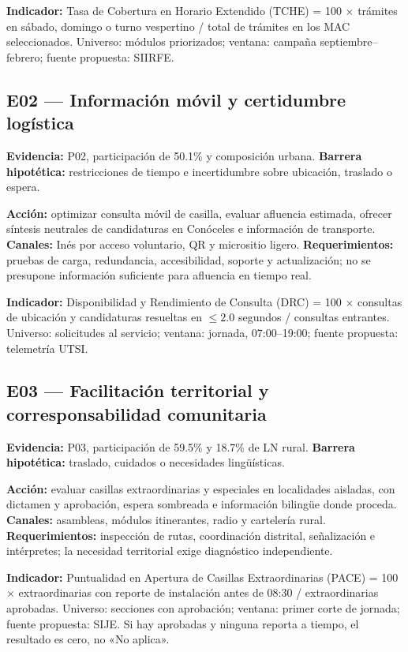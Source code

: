 \documentclass[11pt]{article}
\begin{document}
\textbf{Indicador:} Tasa de Cobertura en Horario Extendido (TCHE) = 100 $\times$ trámites en sábado, domingo o turno vespertino / total de trámites en los MAC seleccionados. Universo: módulos priorizados; ventana: campaña septiembre--febrero; fuente propuesta: SIIRFE.

\subsection{E02 --- Información móvil y certidumbre logística}
\textbf{Evidencia:} P02, participación de 50.1\% y composición urbana.
\textbf{Barrera hipotética:} restricciones de tiempo e incertidumbre sobre ubicación, traslado o espera.

\textbf{Acción:} optimizar consulta móvil de casilla, evaluar afluencia estimada, ofrecer síntesis neutrales de candidaturas en Conóceles e información de transporte.
\textbf{Canales:} Inés por acceso voluntario, QR y micrositio ligero.
\textbf{Requerimientos:} pruebas de carga, redundancia, accesibilidad, soporte y actualización; no se presupone información suficiente para afluencia en tiempo real.

\textbf{Indicador:} Disponibilidad y Rendimiento de Consulta (DRC) = 100 $\times$ consultas de ubicación y candidaturas resueltas en $\leq2.0$ segundos / consultas entrantes. Universo: solicitudes al servicio; ventana: jornada, 07:00--19:00; fuente propuesta: telemetría UTSI.

\subsection{E03 --- Facilitación territorial y corresponsabilidad comunitaria}
\textbf{Evidencia:} P03, participación de 59.5\% y 18.7\% de LN rural.
\textbf{Barrera hipotética:} traslado, cuidados o necesidades lingüísticas.

\textbf{Acción:} evaluar casillas extraordinarias y especiales en localidades aisladas, con dictamen y aprobación, espera sombreada e información bilingüe donde proceda.
\textbf{Canales:} asambleas, módulos itinerantes, radio y cartelería rural.
\textbf{Requerimientos:} inspección de rutas, coordinación distrital, señalización e intérpretes; la necesidad territorial exige diagnóstico independiente.

\textbf{Indicador:} Puntualidad en Apertura de Casillas Extraordinarias (PACE) = 100 $\times$ extraordinarias con reporte de instalación antes de 08:30 / extraordinarias aprobadas. Universo: secciones con aprobación; ventana: primer corte de jornada; fuente propuesta: SIJE. Si hay aprobadas y ninguna reporta a tiempo, el resultado es cero, no «No aplica».
\end{document}
